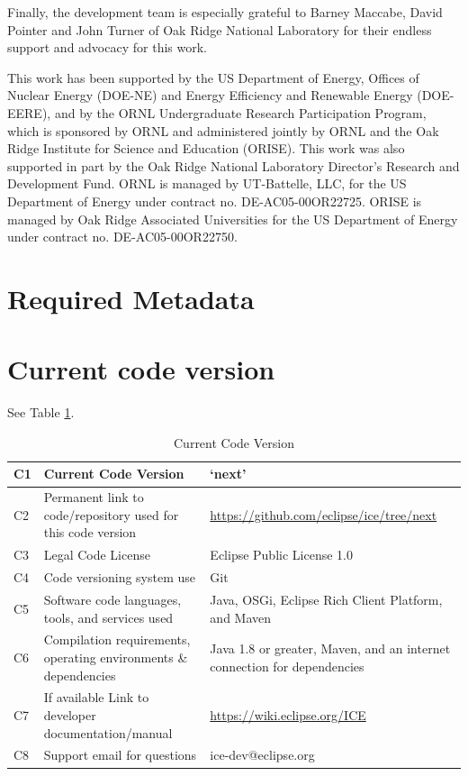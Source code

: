 Finally, the development team is especially grateful to Barney Maccabe,
David Pointer and John Turner of Oak Ridge National Laboratory for their
endless support and advocacy for this work.

This work has been supported by the US Department of Energy, Offices of
Nuclear Energy (DOE-NE) and Energy Efficiency and Renewable Energy
(DOE-EERE), and by the ORNL Undergraduate Research Participation
Program, which is sponsored by ORNL and administered jointly by ORNL and
the Oak Ridge Institute for Science and Education (ORISE). This work was
also supported in part by the Oak Ridge National Laboratory Director's
Research and Development Fund. ORNL is managed by UT-Battelle, LLC, for
the US Department of Energy under contract no. DE-AC05-00OR22725. ORISE
is managed by Oak Ridge Associated Universities for the US Department of
Energy under contract no. DE-AC05-00OR22750.

\section*{Required Metadata}\label{required-metadata}

\section*{Current code version}\label{current-code-version}

See Table \ref{codeTable}.

\begin{table}[!htbp]
\begin{tabularx}{\textwidth}{|l|X|X|}
\hline
C1 & Current Code Version & `next'\tabularnewline\hline
C2 & Permanent link to code/repository used for this code version &
\url{https://github.com/eclipse/ice/tree/next}
\tabularnewline\hline
C3 & Legal Code License & Eclipse Public License 1.0 \tabularnewline\hline
C4 & Code versioning system use & Git \tabularnewline\hline
C5 & Software code languages, tools, and services used & Java, OSGi, Eclipse Rich Client Platform,
and Maven \tabularnewline\hline
C6 & Compilation requirements, operating environments \& dependencies & Java 1.8 or greater, Maven, and
an internet connection for dependencies \tabularnewline\hline 
C7 & If available Link to developer documentation/manual &
\url{https://wiki.eclipse.org/ICE} \tabularnewline\hline 
C8 & Support email for questions & ice-dev@eclipse.org \tabularnewline\hline
\end{tabularx}
\caption{Current Code Version}
\label{codeTable}
\end{table}

